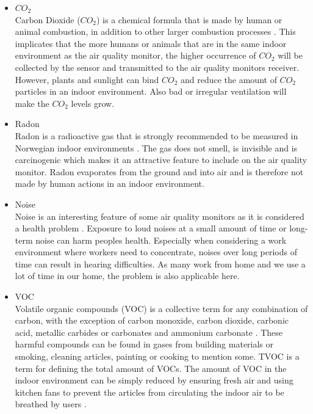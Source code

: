 \begin{itemize}
    \item \(CO_2\)\\
        Carbon Dioxide (\(CO_2\)) is a chemical formula that is made by human or animal combustion, in addition to other larger combustion processes \cite{CO2}. This implicates that the more humans or animals that are in the same indoor environment as the air quality monitor, the higher occurrence of \(CO_2\) will be collected by the sensor and transmitted to the air quality monitors receiver. However, plants and sunlight can bind \(CO_2\) and reduce the amount of \(CO_2\) particles in an indoor environment. Also bad or irregular ventilation will make the \(CO_2\) levels grow. \\
    \item Radon\\
        Radon is a radioactive gas that is strongly recommended to be measured in Norwegian indoor environments \cite{Radon}. The gas does not smell, is invisible and is carcinogenic which makes it an attractive feature to include on the air quality monitor. Radon evaporates from the ground and into air and is therefore not made by human actions in an indoor environment.\\
    \item Noise\\
        Noise is an interesting feature of some air quality monitors as it is considered a health problem \cite{Noise}. Exposure to loud noises at a small amount of time or long-term noise can harm peoples health. Especially when considering a work environment where workers need to concentrate, noises over long periods of time can result in hearing difficulties. As many work from home and we use a lot of time in our home, the problem is also applicable here. \\
    \item VOC\\
        Volatile organic compounds (VOC) is a collective term for any combination of carbon, with the exception of carbon monoxide, carbon dioxide, carbonic acid, metallic carbides or carbonates and ammonium carbonate \cite{VOC}. These harmful compounds can be found in gases from building materials or smoking, cleaning articles, painting or cooking to mention some. TVOC is a term for defining the total amount of VOCs. The amount of VOC in the indoor environment can be simply reduced by ensuring fresh air and using kitchen fans to prevent the articles from circulating the indoor air to be breathed by users \cite{RecommendedIAQ}.\\

\end{itemize}
